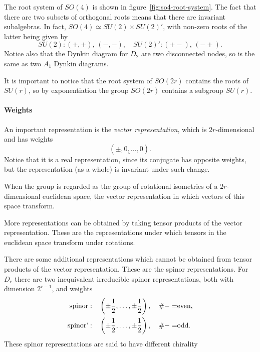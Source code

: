 The root system of $SO(4)$ is shown in figure~\ref{fig:so4-root-system}. The fact that there are
two subsets of orthogonal roots means that there are invariant subalgebras. In fact, $SO(4) \simeq SU(2) \times SU(2)'$, with non-zero roots of the latter being given by
\begin{equation}
    SU(2): (+,+),\,(-,-), \quad SU(2)': (+-),\,(-+) .
\end{equation}
Notice also that the Dynkin diagram for $D_2$ are two disconnected nodes, so is the same as two $A_1$ Dynkin diagrams.

It is important to notice that the root system of $SO(2r)$ contains the roots of $SU(r)$, so by exponentiation the group $SO(2r)$ contains a subgroup $SU(r)$.

\paragraph{Weights}
An important representation is the \emph{vector representation}, which is $2r$-dimensional and has weights
\begin{equation}
    (\underline{\pm,0,\dots,0}).
\end{equation}
Notice that it is a real representation, since its conjugate has opposite weights, but the representation (as a whole) is invariant under such change.

When the group is regarded as the group of rotational isometries of a $2r$-dimensional euclidean space, the vector representation in which vectors of this space transform.

More representations can be obtained by taking tensor products of the vector representation. These are the representations under which tensors in the euclidean space transform under rotations.

There are some additional representations which cannot be obtained from tensor products of the vector representation. These are the spinor representations. For $D_r$ there are two inequivalent irreducible spinor representations, both with dimension $2^{r-1}$, and weights
\begin{equation}
\begin{aligned}
    \textup{spinor}: \quad  &\left(\pm\frac{1}{2}, \dots, \pm \frac{1}{2}\right), \quad \textup{$\#-=$even}, \\
    \textup{spinor'}: \quad &\left(\pm\frac{1}{2}, \dots, \pm \frac{1}{2}\right), \quad \textup{$\#-=$odd}.
\end{aligned}
\end{equation}
These spinor representations are said to have diﬀerent chirality


